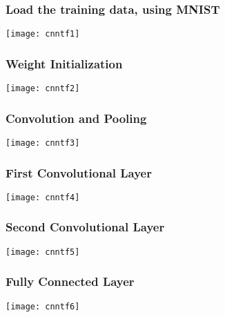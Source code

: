 \begin{frame}[fragile] \frametitle{Load the training data, using MNIST}

\begin{center}
\texttt{[image: cnntf1]}
\end{center}
\end{frame}


\begin{frame}[fragile] \frametitle{Weight Initialization}

\begin{center}
\texttt{[image: cnntf2]}
\end{center}
\end{frame}

\begin{frame}[fragile] \frametitle{Convolution and Pooling}

\begin{center}
\texttt{[image: cnntf3]}
\end{center}
\end{frame}

\begin{frame}[fragile] \frametitle{First Convolutional Layer}

\begin{center}
\texttt{[image: cnntf4]}
\end{center}
\end{frame}


\begin{frame}[fragile] \frametitle{Second Convolutional Layer}

\begin{center}
\texttt{[image: cnntf5]}
\end{center}
\end{frame}


\begin{frame}[fragile] \frametitle{Fully Connected Layer}

\begin{center}
\texttt{[image: cnntf6]}
\end{center}
\end{frame}

